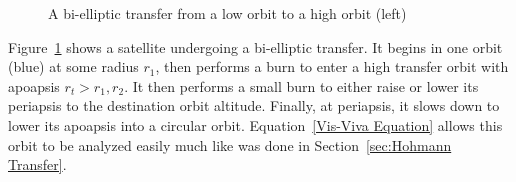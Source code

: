 \documentclass[../basicOrbitalDynamics.tex]{subfiles}
\begin{document}
\begin{figure}[H]
    \centering
    \def\Rone{0.75}
    \def\Rtwo{1.25}
    \def\trAP{4}
    \def\trSMAa{\fpeval{0.5*(\Rone+\trAP)}}
    \def\trSMAb{\fpeval{0.5*(\Rtwo+\trAP)}}
    \def\trEa{\fpeval{(\trAP/\trSMAa) - 1}}
    \def\trEb{\fpeval{(\trAP/\trSMAb) - 1}}
    \def\ctrXa{\fpeval{\Rone-\trSMAa}}
    \def\ctrXb{\fpeval{\Rtwo-\trSMAb}}
    \def\trSmAa{\fpeval{\trSMAa*sqrt(1-(\trEa)^2)}}
    \def\trSmAb{\fpeval{\trSMAb*sqrt(1-(\trEb)^2)}}
    \def\dV{1.25}
    \caption{A bi-elliptic transfer from a low orbit to a high orbit (left)}\label{fig:Bielliptic Transfer}
\end{figure}

Figure~\ref{fig:Bielliptic Transfer} shows a satellite undergoing a bi-elliptic transfer. It begins in one orbit (blue) at some radius $r_1$, then performs a burn to enter a high transfer orbit with apoapsis $r_t>r_1,r_2$. It then performs a small burn to either raise or lower its periapsis to the destination orbit altitude. Finally, at periapsis, it slows down to lower its apoapsis into a circular orbit. Equation~\eqref{Vis-Viva Equation} allows this orbit to be analyzed easily much like was done in Section~\ref{sec:Hohmann Transfer}.
\end{document}
